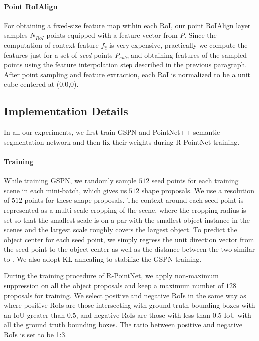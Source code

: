\documentclass[10pt,twocolumn,letterpaper]{article}
\begin{document}
\vspace{-\baselineskip}
\paragraph{Point RoIAlign}
For obtaining a fixed-size feature map within each RoI, our point RoIAlign layer samples $N_{RoI}$ points equipped with a feature vector from $P$. Since the computation of context feature $f_{\hat{c}}$ is very expensive, practically we compute the features just for a set of \emph{seed} points $P_{sub}$, and obtaining features of the sampled points using the feature interpolation step described in the previous paragraph. After point sampling and feature extraction, each RoI is normalized to be a unit cube centered at (0,0,0).

\subsection{Implementation Details}
In all our experiments, we first train GSPN and PointNet++ semantic segmentation network and then fix their weights during R-PointNet training.

\vspace{-\baselineskip}
\paragraph{Training}
While training GSPN, we randomly sample $512$ seed points for each training scene in each mini-batch, which gives us $512$ shape proposals. We use a resolution of $512$ points for these shape proposals. The context around each seed point is represented as a multi-scale cropping of the scene, where the cropping radius is set so that the smallest scale is on a par with the smallest object instance in the scenes and the largest scale roughly covers the largest object. To predict the object center for each seed point, we simply regress the unit direction vector from the seed point to the object center as well as the distance between the two similar to \cite{xiang2017posecnn}. We also adopt KL-annealing \cite{bowman2015generating} to stabilize the GSPN training.

During the training procedure of R-PointNet, we apply non-maximum suppression \cite{girshick2015deformable} on all the object proposals and keep a maximum number of $128$ proposals for training. We select positive and negative RoIs in the same way as \cite{he2017mask} where positive RoIs are those intersecting with ground truth bounding boxes with an IoU greater than $0.5$, and negative RoIs are those with less than $0.5$ IoU with all the ground truth bounding boxes. The ratio between positive and negative RoIs is set to be 1:3.
\end{document}
